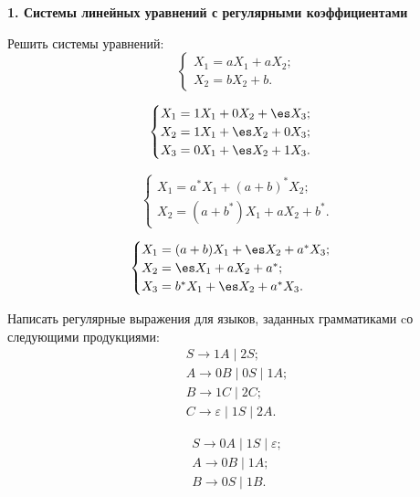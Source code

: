\twocolumn[\begin{center}
{\bfseries\Large \textsc{\Llabel{} \Lnum}}
\end{center}]
\textbf{1. Системы линейных уравнений с регулярными коэффициентами}

Решить системы уравнений:
\begin{equation}
    \begin{cases}
    X_1 = aX_1 + aX_2;\\
    X_2 = bX_2 + b.
    \end{cases}
\end{equation} 

\begin{equation}
    \begin{cases}
        X_1 = 1X_1 + 0X_2 + \es X_3; \\
        X_2 = 1X_1 + \es X_2 + 0X_3; \\
        X_3 = 0X_1 + \es X_2 + 1X_3. 
    \end{cases}
\end{equation} 

\begin{equation}
    \begin{cases}
        X_1 = a^{\ast}X_1 + (a+b)^{\ast}X_2;\\
        X_2 = (a+b^{\ast})X_1 + aX_2 + b^\ast.
    \end{cases}
\end{equation}

\begin{equation}
    \begin{cases}
        X_1 = (a+b)X_1 + \es X_2 + a^{\ast}X_3; \\
        X_2 = \es X_1 + aX_2 + a^{\ast}; \\
        X_3 = b^{\ast}X_1 + \es X_2 + a^{\ast}X_3.
    \end{cases}
\end{equation} 

Написать регулярные выражения для языков, заданных грамматиками cо
следующими продукциями:
\begin{equation}
\begin{array}{l}
S \to 1A \mid 2S; \\
A \to 0B \mid 0S \mid 1A; \\
B \to 1C \mid 2C; \\
C \to \varepsilon \mid 1S \mid 2A.
\end{array}
\end{equation}

\begin{equation}
\begin{array}{l}
S \to 0A \mid 1S \mid \varepsilon ;\\
A \to 0B \mid 1A;\\
B \to 0S \mid 1B.
\end{array}
\end{equation}

